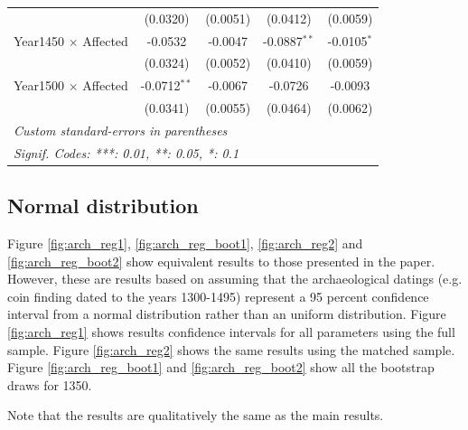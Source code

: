 \begin{table}
\begin{tabular}{lcccc}
                               & (0.0320)               & (0.0051)               & (0.0412)       & (0.0059)\\   
   Year1450 $\times$ Affected  & -0.0532                & -0.0047                & -0.0887$^{**}$ & -0.0105$^{*}$\\   
                               & (0.0324)               & (0.0052)               & (0.0410)       & (0.0059)\\   
   Year1500 $\times$ Affected  & -0.0712$^{**}$         & -0.0067                & -0.0726        & -0.0093\\   
                               & (0.0341)               & (0.0055)               & (0.0464)       & (0.0062)\\    
   \midrule \midrule
   \multicolumn{5}{l}{\emph{Custom standard-errors in parentheses}}\\
   \multicolumn{5}{l}{\emph{Signif. Codes: ***: 0.01, **: 0.05, *: 0.1}}\\
\end{tabular}
\end{table}

\FloatBarrier
\subsection{Normal distribution}
Figure \ref{fig:arch_reg1}, \ref{fig:arch_reg_boot1}, \ref{fig:arch_reg2} and \ref{fig:arch_reg_boot2} show equivalent results to those presented in the paper. However, these are results based on assuming that the archaeological datings (e.g. coin finding dated to the years 1300-1495) represent a 95 percent confidence interval from a normal distribution rather than an uniform distribution. Figure \ref{fig:arch_reg1} shows results confidence intervals for all parameters using the full sample. Figure \ref{fig:arch_reg2} shows the same results using the matched sample. Figure \ref{fig:arch_reg_boot1} and \ref{fig:arch_reg_boot2} show all the bootstrap draws for 1350.

Note that the results are qualitatively the same as the main results. 


